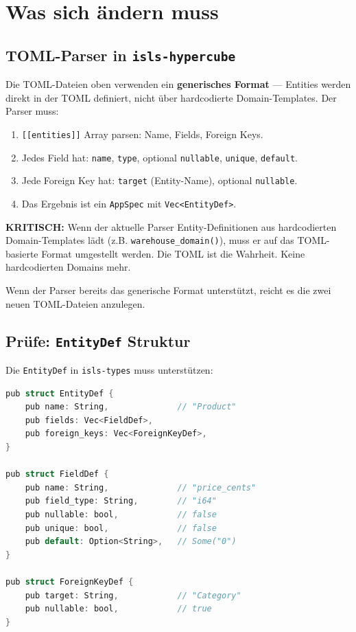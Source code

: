 \documentclass[11pt,a4paper]{article}
\begin{document}
\section{Was sich \"andern muss}

\subsection{TOML-Parser in \texttt{isls-hypercube}}

Die TOML-Dateien oben verwenden ein \textbf{generisches Format} ---
Entities werden direkt in der TOML definiert, nicht \"uber hardcodierte
Domain-Templates. Der Parser muss:

\begin{enumerate}[nosep]
\item \texttt{[[entities]]} Array parsen: Name, Fields, Foreign Keys.
\item Jedes Field hat: \texttt{name}, \texttt{type}, optional \texttt{nullable},
      \texttt{unique}, \texttt{default}.
\item Jede Foreign Key hat: \texttt{target} (Entity-Name), optional \texttt{nullable}.
\item Das Ergebnis ist ein \texttt{AppSpec} mit \texttt{Vec<EntityDef>}.
\end{enumerate}

\textbf{KRITISCH:} Wenn der aktuelle Parser Entity-Definitionen aus
hardcodierten Domain-Templates l\"adt (z.B. \texttt{warehouse\_domain()}),
muss er auf das TOML-basierte Format umgestellt werden. Die TOML ist
die Wahrheit. Keine hardcodierten Domains mehr.

Wenn der Parser bereits das generische Format unterst\"utzt, reicht es
die zwei neuen TOML-Dateien anzulegen.

\subsection{Pr\"ufe: \texttt{EntityDef} Struktur}

Die \texttt{EntityDef} in \texttt{isls-types} muss unterst\"utzen:

\begin{lstlisting}[language=C]
pub struct EntityDef {
    pub name: String,              // "Product"
    pub fields: Vec<FieldDef>,
    pub foreign_keys: Vec<ForeignKeyDef>,
}

pub struct FieldDef {
    pub name: String,              // "price_cents"
    pub field_type: String,        // "i64"
    pub nullable: bool,            // false
    pub unique: bool,              // false
    pub default: Option<String>,   // Some("0")
}

pub struct ForeignKeyDef {
    pub target: String,            // "Category"
    pub nullable: bool,            // true
}
\end{lstlisting}
\end{document}
